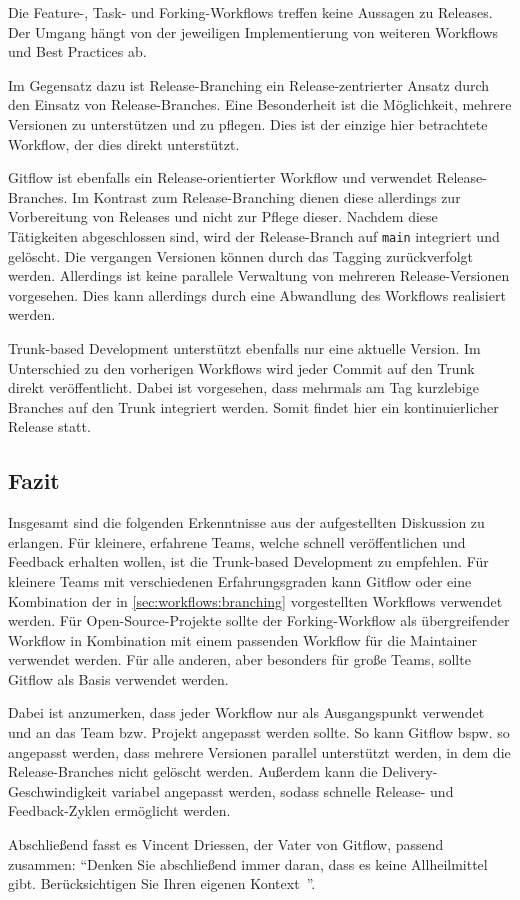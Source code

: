 Die Feature-, Task- und Forking\hyp Workflows treffen keine Aussagen zu Releases. Der Umgang hängt von der jeweiligen Implementierung von weiteren Workflows und Best Practices ab.

Im Gegensatz dazu ist Release\hyp Branching ein Release\hyp zentrierter Ansatz durch den Einsatz von Release\hyp Branches. Eine Besonderheit ist die Möglichkeit, mehrere Versionen zu unterstützen und zu pflegen. Dies ist der einzige hier betrachtete Workflow, der dies direkt unterstützt.

Gitflow ist ebenfalls ein Release\hyp orientierter Workflow und verwendet Release\hyp Branches. Im Kontrast zum Release\hyp Branching dienen diese allerdings zur Vorbereitung von Releases und nicht zur Pflege dieser. Nachdem diese Tätigkeiten abgeschlossen sind, wird der Release\hyp Branch auf \texttt{main} integriert und gelöscht. Die vergangen Versionen können durch das Tagging zurückverfolgt werden. Allerdings ist keine parallele Verwaltung von mehreren Release\hyp Versionen vorgesehen. Dies kann allerdings durch eine Abwandlung des Workflows realisiert werden.

Trunk\hyp based Development unterstützt ebenfalls nur eine aktuelle Version. Im Unterschied zu den vorherigen Workflows wird jeder Commit auf den Trunk direkt veröffentlicht. Dabei ist vorgesehen, dass mehrmals am Tag kurzlebige Branches auf den Trunk integriert werden. Somit findet hier ein kontinuierlicher Release statt.


\subsection{Fazit}

Insgesamt sind die folgenden Erkenntnisse aus der aufgestellten Diskussion zu erlangen. Für kleinere, erfahrene Teams, welche schnell veröffentlichen und Feedback erhalten wollen, ist die Trunk\hyp based Development zu empfehlen. Für kleinere Teams mit verschiedenen Erfahrungsgraden kann Gitflow oder eine Kombination der in \autoref{sec:workflows:branching} vorgestellten Workflows verwendet werden. Für Open\hyp Source\hyp Projekte sollte der Forking\hyp Workflow als übergreifender Workflow in Kombination mit einem passenden Workflow für die Maintainer verwendet werden. Für alle anderen, aber besonders für große Teams, sollte Gitflow als Basis verwendet werden.

Dabei ist anzumerken, dass jeder Workflow nur als Ausgangspunkt verwendet und an das Team bzw. Projekt angepasst werden sollte. So kann Gitflow bspw. so angepasst werden, dass mehrere Versionen parallel unterstützt werden, in dem die Release\hyp Branches nicht gelöscht werden. Außerdem kann die Delivery\hyp Geschwindigkeit variabel angepasst werden, sodass schnelle Release- und Feedback\hyp Zyklen ermöglicht werden.

Abschließend fasst es Vincent Driessen, der Vater von Gitflow, passend zusammen: \enquote{Denken Sie abschließend immer daran, dass es keine Allheilmittel gibt. Berücksichtigen Sie Ihren eigenen Kontext~\cite{driessenGitflow2012}}.
